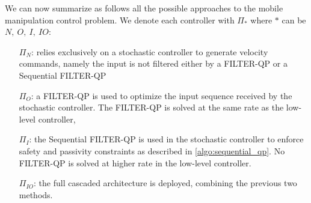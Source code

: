 We can now summarize as follows all the possible approaches to the mobile manipulation control problem. We denote each controller with $\Pi_{*}$ where $*$ can be $N,\ O,\ I,\ IO$:
\begin{itemize}
    \item[$\Pi_{N}$:] relies exclusively on a stochastic controller to generate velocity commands, namely the input is not filtered either by a FILTER-QP or a Sequential FILTER-QP
    \item[$\Pi_{O}$:] a FILTER-QP is used to optimize the input sequence received by the stochastic controller. The FILTER-QP is solved at the same rate as the low-level controller,
    \item[$\Pi_{I}$:] the Sequential FILTER-QP is used in the stochastic controller to enforce safety and passivity constraints  as described in \algo \ref{algo:sequential_qp}. No FILTER-QP is solved at higher rate in the low-level controller.
    \item[$\Pi_{IO}$:] the full cascaded architecture is deployed, combining the previous two methods.
\end{itemize}
